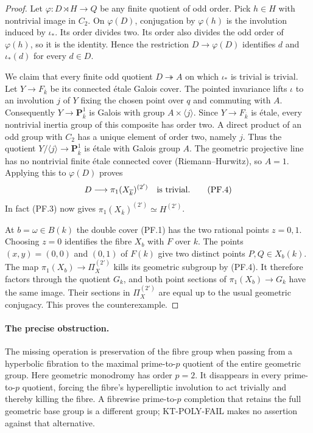 \begin{proof}
Let $\varphi:D\rtimes H\to Q$ be any finite quotient of odd
order. Pick $h\in H$ with nontrivial image in $C_2$.
On $\varphi(D)$, conjugation by $\varphi(h)$ is the involution
induced by $\iota_*$. Its order divides two. Its order also
divides the odd order of $\varphi(h)$, so it is the identity.
Hence the restriction $D\to\varphi(D)$ identifies $d$ and
$\iota_*(d)$ for every $d\in D$.

We claim that every finite odd quotient $D\twoheadrightarrow A$
on which $\iota_*$ is trivial is trivial. Let $Y\to F_{\overline k}$
be its connected \'etale Galois cover. The pointed invariance
lifts $\iota$ to an involution $j$ of $Y$ fixing the chosen point
over $q$ and commuting with $A$. Consequently
$Y\to\mathbf P^1_{\overline k}$ is Galois with group
$A\times\langle j\rangle$. Since $Y\to F_{\overline k}$ is
\'etale, every nontrivial inertia group of this composite has
order two. A direct product of an odd group with $C_2$ has a
unique element of order two, namely $j$. Thus the quotient
$Y/\langle j\rangle\to\mathbf P^1_{\overline k}$ is \'etale
with Galois group $A$. The geometric projective line has no
nontrivial finite \'etale connected cover (Riemann--Hurwitz),
so $A=1$. Applying this to $\varphi(D)$ proves
\[
 D\longrightarrow\pi_1(X_{\overline k})^{(2')}
 \quad\hbox{is trivial}.                                  \tag{PF.4}
\]
In fact (PF.3) now gives
$\pi_1(X_{\overline k})^{(2')}\simeq H^{(2')}$.

At $b=\omega\in B(k)$ the double cover (PF.1) has the two
rational points $z=0,1$. Choosing $z=0$ identifies the fibre
$X_b$ with $F$ over $k$. The points $(x,y)=(0,0)$ and $(0,1)$
of $F(k)$ give two distinct points $P,Q\in X_b(k)$.
The map $\pi_1(X_b)\to\Pi_X^{(2')}$ kills its geometric
subgroup by (PF.4). It therefore factors through the quotient
$G_k$, and both point sections of $\pi_1(X_b)\to G_k$ have
the same image. Their sections in $\Pi_X^{(2')}$ are equal
up to the usual geometric conjugacy. This proves the
counterexample.
\end{proof}

\paragraph{The precise obstruction.}
The missing operation is preservation of the fibre group when
passing from a hyperbolic fibration to the maximal prime-to-$p$
quotient of the entire geometric group. Here geometric monodromy
has order $p=2$. It disappears in every prime-to-$p$ quotient,
forcing the fibre's hyperelliptic involution to act trivially and
thereby killing the fibre. A fibrewise prime-to-$p$ completion
that retains the full geometric base group is a different group;
KT-POLY-FAIL makes no assertion against that alternative.

